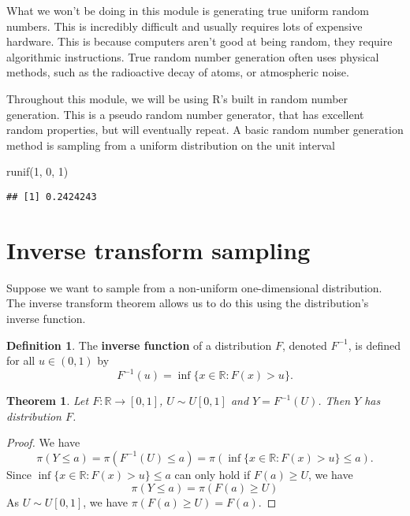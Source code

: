 \documentclass[
]{book}
\newenvironment{Shaded}{\begin{snugshade}}{\end{snugshade}}
\newcommand{\DecValTok}[1]{\textcolor[rgb]{0.00,0.00,0.81}{#1}}
\newcommand{\FunctionTok}[1]{\textcolor[rgb]{0.00,0.00,0.00}{#1}}
\newcommand{\NormalTok}[1]{#1}
\newtheorem{theorem}{Theorem}[chapter]
\theoremstyle{definition}
\newtheorem{definition}{Definition}[chapter]
\theoremstyle{definition}
\theoremstyle{definition}
\theoremstyle{definition}
\theoremstyle{remark}
\begin{document}
What we won't be doing in this module is generating true uniform random numbers. This is incredibly difficult and usually requires lots of expensive hardware. This is because computers aren't good at being random, they require algorithmic instructions. True random number generation often uses physical methods, such as the radioactive decay of atoms, or atmospheric noise.

Throughout this module, we will be using R's built in random number generation. This is a pseudo random number generator, that has excellent random properties, but will eventually repeat. A basic random number generation method is sampling from a uniform distribution on the unit interval

\begin{Shaded}
\begin{Highlighting}[]
\FunctionTok{runif}\NormalTok{(}\DecValTok{1}\NormalTok{, }\DecValTok{0}\NormalTok{, }\DecValTok{1}\NormalTok{)}
\end{Highlighting}
\end{Shaded}

\begin{verbatim}
## [1] 0.2424243
\end{verbatim}

\hypertarget{inverse-transform-sampling}{%
\section{Inverse transform sampling}\label{inverse-transform-sampling}}

Suppose we want to sample from a non-uniform one-dimensional distribution. The inverse transform theorem allows us to do this using the distribution's inverse function.

\begin{definition}
The \textbf{inverse function} of a distribution \(F\), denoted \(F^{-1}\), is defined for all \(u \in (0, 1)\) by
\[
F^{-1}(u) = \inf\{x \in\mathbb{R} : F(x) > u\}.
\]
\end{definition}

\begin{theorem}
Let \(F :\mathbb{R} \rightarrow [0, 1]\), \(U \sim U[0, 1]\) and \(Y = F^{-1}(U)\). Then \(Y\) has distribution \(F\).
\end{theorem}

\begin{proof}
We have
\[
\pi(Y \leq a) = \pi(F^{-1}(U) \leq a) = \pi(\inf\{x \in\mathbb{R} : F(x) > u\} \leq a). 
\]
Since \(\inf\{x \in\mathbb{R} : F(x) > u\} \leq a\) can only hold if \(F(a) \geq U\), we have
\[
\pi(Y \leq a)  = \pi(F(a)\geq U)
\]
As \(U \sim U[0, 1]\), we have \(\pi(F(a)\geq U) = F(a)\).
\end{proof}
\end{document}
